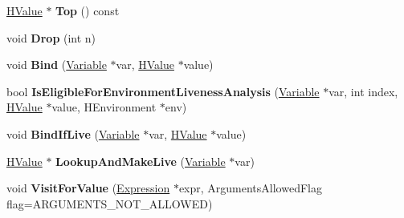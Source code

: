 \begin{DoxyCompactItemize}
\item 
\hypertarget{classv8_1_1internal_1_1_h_optimized_graph_builder_afe8c1f6d13c7c616c5e840181db6f23e}{}\hyperlink{classv8_1_1internal_1_1_h_value}{H\+Value} $\ast$ {\bfseries Top} () const \label{classv8_1_1internal_1_1_h_optimized_graph_builder_afe8c1f6d13c7c616c5e840181db6f23e}

\item 
\hypertarget{classv8_1_1internal_1_1_h_optimized_graph_builder_ae0b590e99749e2483a78cb7616b29213}{}void {\bfseries Drop} (int n)\label{classv8_1_1internal_1_1_h_optimized_graph_builder_ae0b590e99749e2483a78cb7616b29213}

\item 
\hypertarget{classv8_1_1internal_1_1_h_optimized_graph_builder_af118784358a7d98ccabcd369625adfcc}{}void {\bfseries Bind} (\hyperlink{classv8_1_1internal_1_1_variable}{Variable} $\ast$var, \hyperlink{classv8_1_1internal_1_1_h_value}{H\+Value} $\ast$value)\label{classv8_1_1internal_1_1_h_optimized_graph_builder_af118784358a7d98ccabcd369625adfcc}

\item 
\hypertarget{classv8_1_1internal_1_1_h_optimized_graph_builder_a5782939a23ee3b9ddd83ff267a9c69c8}{}bool {\bfseries Is\+Eligible\+For\+Environment\+Liveness\+Analysis} (\hyperlink{classv8_1_1internal_1_1_variable}{Variable} $\ast$var, int index, \hyperlink{classv8_1_1internal_1_1_h_value}{H\+Value} $\ast$value, H\+Environment $\ast$env)\label{classv8_1_1internal_1_1_h_optimized_graph_builder_a5782939a23ee3b9ddd83ff267a9c69c8}

\item 
\hypertarget{classv8_1_1internal_1_1_h_optimized_graph_builder_a7a976013440aefb89d4777bcd40910ed}{}void {\bfseries Bind\+If\+Live} (\hyperlink{classv8_1_1internal_1_1_variable}{Variable} $\ast$var, \hyperlink{classv8_1_1internal_1_1_h_value}{H\+Value} $\ast$value)\label{classv8_1_1internal_1_1_h_optimized_graph_builder_a7a976013440aefb89d4777bcd40910ed}

\item 
\hypertarget{classv8_1_1internal_1_1_h_optimized_graph_builder_aadc60a5cf1a97a20010bbb1ab3511a20}{}\hyperlink{classv8_1_1internal_1_1_h_value}{H\+Value} $\ast$ {\bfseries Lookup\+And\+Make\+Live} (\hyperlink{classv8_1_1internal_1_1_variable}{Variable} $\ast$var)\label{classv8_1_1internal_1_1_h_optimized_graph_builder_aadc60a5cf1a97a20010bbb1ab3511a20}

\item 
\hypertarget{classv8_1_1internal_1_1_h_optimized_graph_builder_ae8b3eed58ef6bcc740d9a7e47e35c15f}{}void {\bfseries Visit\+For\+Value} (\hyperlink{classv8_1_1internal_1_1_expression}{Expression} $\ast$expr, Arguments\+Allowed\+Flag flag=A\+R\+G\+U\+M\+E\+N\+T\+S\+\_\+\+N\+O\+T\+\_\+\+A\+L\+L\+O\+W\+E\+D)\label{classv8_1_1internal_1_1_h_optimized_graph_builder_ae8b3eed58ef6bcc740d9a7e47e35c15f}


\end{DoxyCompactItemize}
